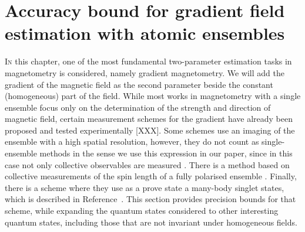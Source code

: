 \section[Metrology of the gradient magnetic field]
{Accuracy bound for gradient field estimation with atomic ensembles}
\label{sec:gm}



\lettrine[lines=2, findent=3pt, nindent=0pt]{I}{n} this chapter, one of the most fundamental two-parameter estimation tasks in magnetometry is considered, namely gradient magnetometry.
We will add the gradient of the magnetic field as the second parameter beside the constant (homogeneous) part of the field.
While most works in magnetometry with a single ensemble focus only on the determination of the strength and direction of magnetic field, certain measurement schemes for the gradient have already been proposed and tested experimentally [XXX].
Some schemes use an imaging of the ensemble with a high spatial resolution, however, they do not count as single-ensemble methods in the sense we use this expression in our paper, since in this case not only collective observables are measured  \citep{Vengalattore2007,Zhou2010,Koschorreck2011}.
There is a method based on collective measurements of the spin length of a fully polarised ensemble \citep{Behbood2013}.
Finally, there is a scheme where they use as a prove state a many-body singlet states, which is described in Reference~\citep{Urizar-Lanz2013}.
This section provides precision bounds for that scheme, while expanding the quantum states considered to other interesting quantum states, including those that are not invariant under homogeneous fields.

